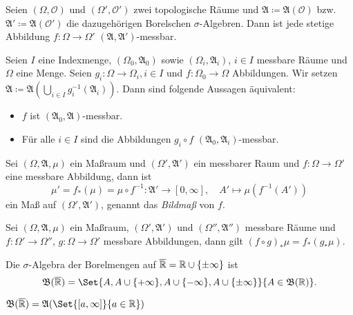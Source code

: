 \documentclass{cheat-sheet}
\newcommand{\Alg}{\mathfrak{A}} %
\newcommand{\Bor}{\mathfrak{B}} %
\theoremstyle{definition}
\begin{document}
\begin{satz}
  Seien $(\Omega, \mathcal{O})$ und $(\Omega', \mathcal{O}')$ zwei topologische Räume und $\Alg \coloneqq \Alg(\mathcal{O})$ bzw. $\Alg' \coloneqq \Alg(\mathcal{O}')$ die dazugehörigen Borelschen $\sigma$-Algebren. Dann ist jede stetige Abbildung $f : \Omega \to \Omega'$ $(\Alg, \Alg')$-messbar.
\end{satz}


\begin{satz}[Projektionssatz]
  Seien $I$ eine Indexmenge, $(\Omega_0, \Alg_0)$ sowie $(\Omega_i, \Alg_i)$, $i \in I$ messbare Räume und $\Omega$ eine Menge. Seien $g_i : \Omega \to \Omega_i, i \in I$ und $f : \Omega_0 \to \Omega$ Abbildungen. Wir setzen $\Alg \coloneqq \Alg\left( \bigcup_{i \in I} g_i^{-1}(\Alg_i) \right)$. Dann sind folgende Aussagen äquivalent:
  \begin{itemize}
    \item $f$ ist $(\Alg_0, \Alg)$-messbar.
    \item Für alle $i \in I$ sind die Abbildungen $g_i \circ f$ $(\Alg_0, \Alg_i)$-messbar.
  \end{itemize}
\end{satz}

\begin{satz}
  Sei $(\Omega, \Alg, \mu)$ ein Maßraum und $(\Omega', \Alg')$ ein messbarer Raum und $f : \Omega \to \Omega'$ eine messbare Abbildung, dann ist
  \[ \mu' = f_*(\mu) = \mu \circ f^{-1} : \Alg' \to [0, \infty], \quad A' \mapsto \mu(f^{-1}(A')) \]
  ein Maß auf $(\Omega', \Alg')$, genannt das \emph{Bildmaß} von $f$.
\end{satz}

\begin{bem}
  Sei $(\Omega, \Alg, \mu)$ ein Maßraum, $(\Omega', \Alg')$ und $(\Omega'', \Alg'')$ messbare Räume und $f : \Omega' \to \Omega''$, $g : \Omega \to \Omega'$ messbare Abbildungen, dann gilt $(f \circ g)_* \mu = f_*(g_* \mu)$.
\end{bem}

\begin{defn}
  Die $\sigma$-Algebra der Borelmengen auf $\overline{\mathbb{R}} = \mathbb{R} \cup \{ \pm \infty \}$ ist
  \[ \Bor(\ER) = \Set{ A, A \cup \{ +\infty \}, A \cup \{ -\infty \}, A \cup \{ \pm \infty \} }{ A \in \Bor(\R) }. \]
\end{defn}

\begin{satz}
  $\Bor(\ER) = \Alg(\Set{ [a, \infty] }{ a \in \R })$
\end{satz}
\end{document}
